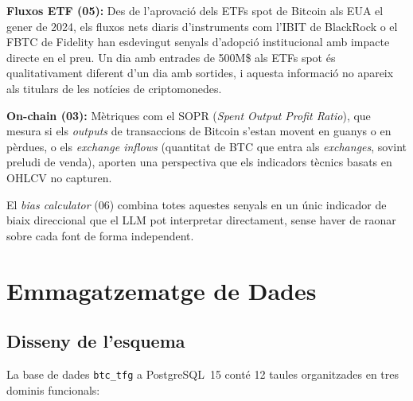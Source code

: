 \documentclass[12pt, a4paper]{report}
\begin{document}
\textbf{Fluxos ETF (05):} Des de l'aprovació dels ETFs spot de Bitcoin als EUA el gener de 2024, els fluxos nets diaris d'instruments com l'IBIT de BlackRock o el FBTC de Fidelity han esdevingut senyals d'adopció institucional amb impacte directe en el preu. Un dia amb entrades de 500M\$ als ETFs spot és qualitativament diferent d'un dia amb sortides, i aquesta informació no apareix als titulars de les notícies de criptomonedes.

\textbf{On-chain (03):} Mètriques com el SOPR (\textit{Spent Output Profit Ratio}), que mesura si els \textit{outputs} de transaccions de Bitcoin s'estan movent en guanys o en pèrdues, o els \textit{exchange inflows} (quantitat de BTC que entra als \textit{exchanges}, sovint preludi de venda), aporten una perspectiva que els indicadors tècnics basats en OHLCV no capturen.

El \textit{bias calculator} (06) combina totes aquestes senyals en un únic indicador de biaix direccional que el LLM pot interpretar directament, sense haver de raonar sobre cada font de forma independent.

\chapter{Emmagatzematge de Dades}

\section{Disseny de l'esquema}

La base de dades \texttt{btc\_tfg} a PostgreSQL~15 conté 12 taules organitzades en tres dominis funcionals:
\end{document}
